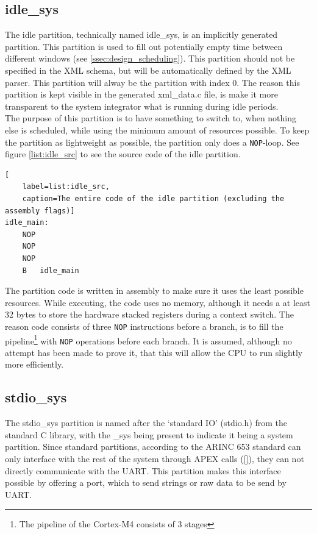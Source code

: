 \subsection{idle\_sys}
\label{ssec:idle_part}
The idle partition, technically named idle\_sys, is an implicitly generated
partition. This partition is used to fill out potentially empty time between
different windows (see \ref{ssec:design_scheduling}). This partition should not
be specified in the XML schema, but will be automatically defined by the XML
parser. This partition will alway be the partition with index 0. The reason this
partition is kept visible in the generated xml\_data.c file, is make it more
transparent to the system integrator what is running during idle periods.\\

The purpose of this partition is to have something to switch to, when nothing
else is scheduled, while using the minimum amount of resources possible.
To keep the partition as lightweight as possible, the partition only does a
\texttt{NOP}-loop. See figure \ref{list:idle_src} to see the source code of the
idle partition.\\
\begin {lstlisting}[
	label=list:idle_src,
	caption=The entire code of the idle partition (excluding the assembly flags)]
idle_main:
	NOP
	NOP
	NOP
	B   idle_main
\end{lstlisting}

The partition code is written in assembly to make sure it uses the least possible
resources. While executing, the code uses no memory, although it needs a at
least 32 bytes to store the hardware stacked registers during a context switch.
The reason code consists of three \texttt{NOP} instructions before a branch, is
to fill the pipeline\footnote{The pipeline of the Cortex-M4 consists of 3 stages}
with \texttt{NOP} operations before each branch. It is assumed, although no
attempt has been made to prove it, that this will allow the CPU to run slightly
more efficiently.

\subsection{stdio\_sys}
\label{impl:stdio_sys}
The stdio\_sys partition is named after the `standard IO' (stdio.h) from the
standard C library, with the \_sys being present to indicate it being a system
partition. Since standard partitions, according to the ARINC 653 standard can
only interface with the rest of the system through APEX calls (\ref{}), they can
not directly communicate with the UART. This partition makes this interface
possible by offering a port, which to send strings or raw data to be send by
UART.\\

